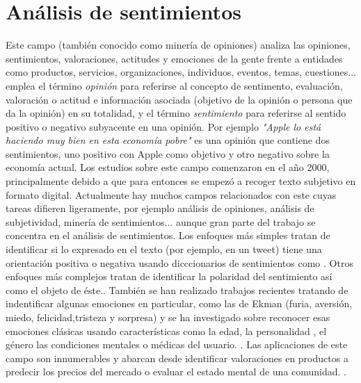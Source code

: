 \section*{Análisis de sentimientos}
Este campo (también conocido como minería de opiniones) analiza las opiniones, sentimientos, valoraciones, actitudes y emociones de la gente frente a entidades como productos, servicios, organizaciones, individuos, eventos, temas, cuestiones...\newline
\citet{9781107017894} emplea el término \textsl{opinión} para referirse al concepto de sentimento, evaluación, valoración o actitud e información asociada (objetivo de la opinión o persona que da la opinión) en su totalidad, y el término \textsl{sentimiento} para referirse al sentido positivo o negativo subyacente en una opinión. Por ejemplo \textsl{"Apple lo está haciendo muy bien en esta economía pobre"} es una opinión que contiene dos sentimientos, uno positivo con Apple como objetivo y otro negativo sobre la economía actual.\newline
 Los estudios sobre este campo comenzaron en el año 2000, principalmente debido a que para entonces se empezó a recoger texto subjetivo en formato digital. Actualmente hay muchos campos relacionados con este cuyas tareas difieren ligeramente, por ejemplo análisis de opiniones, análisis de subjetividad, minería de sentimientos... aunque gran parte del trabajo se concentra en el análisis de sentimientos. \newline
 Los enfoques más simples tratan de identificar si lo expresado en el texto (por ejemplo, en un tweet) tiene una orientación positiva o negativa usando dicccionarios de sentimientos como \citet{whissell1989dictionary}. Otros enfoques más complejos tratan de identificar la polaridad del sentimiento así como el objeto de éste.\citet{wiebe2005annotating}. También se han realizado trabajos recientes tratando de indentificar algunas emociones en particular, como las de Ekman (furia, aversión, miedo, felicidad,tristeza y sorpresa) y se ha investigado sobre reconocer esas emociones clásicas usando características como la edad, la personalidad , el género las condiciones mentales o médicas del usuario.  \citet{hirschberg2015advances}. \newline
Las aplicaciones de este campo son innumerables y abarcan desde identificar valoraciones en productos \citet{wang2015sentiment} a predecir los precios del mercado o evaluar el estado mental de una comunidad. \citet{bollen2011modeling}.
